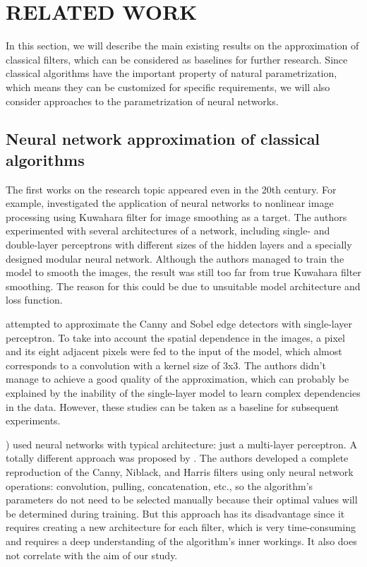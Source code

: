 \section*{\textbf{RELATED WORK}}

In this section, we will describe the main existing results on the approximation of classical filters, which can be considered as baselines for further research. Since classical algorithms have the important property of natural parametrization, which means they can be customized for specific requirements, we will also consider approaches to the parametrization of neural networks. 

\subsection*{\textbf{Neural network approximation of classical algorithms}}

The first works on the research topic appeared even in the 20th century. For example, \cite{Ridder99Kuwahara} investigated the application of neural networks to nonlinear image processing using Kuwahara filter for image smoothing as a target. The authors experimented with several architectures of a network, including single- and double-layer perceptrons with different sizes of the hidden layers and a specially designed modular neural network. Although the authors managed to train the model to smooth the images, the result was still too far from true Kuwahara filter smoothing. The reason for this could be due to unsuitable model architecture and loss function. 

\cite{Fernandez11} attempted to approximate the Canny and Sobel edge detectors with single-layer perceptron. To take into account the spatial dependence in the images, a pixel and its eight adjacent pixels were fed to the input of the model, which almost corresponds to a convolution with a kernel size of 3x3. The authors didn't manage to achieve a good quality of the approximation, which can probably be explained by the inability of the single-layer model to learn complex dependencies in the data. However, these studies can be taken as a baseline for subsequent experiments.


\cite{Fernandez11, Ridder99Kuwahara}) used neural networks with typical architecture: just a multi-layer perceptron. A totally different approach was proposed by \cite{Zhukovsky2018}. The authors developed a complete reproduction of the Canny, Niblack, and Harris filters using only neural network operations: convolution, pulling, concatenation, etc., so the algorithm's parameters do not need to be selected manually because their optimal values will be determined during training. But this approach has its disadvantage since it requires creating a new architecture for each filter, which is very time-consuming and requires a deep understanding of the algorithm's inner workings. It also does not correlate with the aim of our study. 


